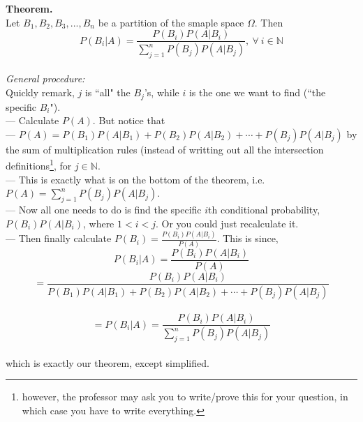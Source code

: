 \documentclass[12pt]{book}
\begin{document}
\noindent\textbf{Theorem.}\\
Let $B_{1},B_{2},B_{3},...,B_{n}$ be a partition of the smaple space $\Omega$. 
Then $$\boxed{P(B_{i}|A)=\dfrac{P(B_{i})P(A|B_{i})}{\sum\limits_{j=1}^{n}P(B_{j})P(A|B_{j})},~\forall~i\in\mathbb{N}}$$\\
\textit{General procedure:}\\
Quickly remark, $j$ is ``all" the $B_j$'s, while $i$ is the one we want to find (``the specific $B_i$").\\
--- Calculate $P(A)$. But notice that\\
--- $P(A)=P(B_1)P(A|B_1)+P(B_2)P(A|B_2)+\cdots+P(B_j)P(A|B_j)$ by the sum of multiplication rules (instead of writting out all the intersection definitions\footnote{however, the professor may ask you to write/prove this for your question, in which case you have to write everything.}, for $j\in\mathbb{N}$.\\
--- This is exactly what is on the bottom of the theorem, i.e. $P(A)=\sum\limits_{j=1}^{n} P(B_{j})P(A|B_{j})$.\\
--- Now all one needs to do is find the specific $i$th conditional probability, $P(B_{i})P(A|B_{i})$, where $1<i<j$. Or you could just recalculate it. \\
--- Then finally calculate $\boxed{P(B_i)=\frac{P(B_i)P(A|B_i)}{P(A)}}$. This is since,  \newpage
$$\boxed{P(B_i|A)=\frac{P(B_{i})P(A|B_{i})}{P(A)}}$$
$$=\frac{P(B_{i})P(A|B_{i})}{P(B_1)P(A|B_1)+P(B_2)P(A|B_2)+\cdots+P(B_j)P(A|B_j)}$$\\
$$=P(B_{i}|A)=\dfrac{P(B_{i})P(A|B_{i})}{\sum\limits_{j=1}^{n}P(B_{j})P(A|B_{j})}$$\\
which is exactly our theorem, except simplified.



\end{document}
